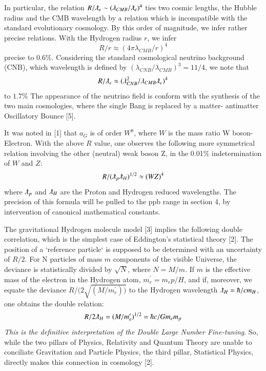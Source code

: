 \documentclass[twoside,draft]{article}
\begin{document}
\begin{sloppypar}
{In particular, the relation $R/\lambdabar_{e} \sim (\lambda_{CMB} / \lambdabar_{e})^{4}$ ties two cosmic lengths, the Hubble radius and the CMB wavelength by a relation which is incompatible with the standard evolutionary cosmology. By this order of magnitude, we infer rather precise relations. With the Hydrogen radius $r$, we infer $$R/r \approx (4\pi \lambda_{CMB} /r)^{4}$$ precise to $0.6\%$. 
Considering the standard cosmological neutrino background (CNB), which wavelength is defined by $(\lambda_{CNB} / \lambda_{CMB})^{3} = 11/4$, we note that $$R/ \lambdabar_{e} \approx
( \lambda_{CNB}^{2} / \lambda_{CMB} \lambdabar_{e} )^{4}$$ to $1.7\%$
The appearance of the neutrino field is conform
with the synthesis of the two main cosmologies, where the single Bang is replaced by a matter-
antimatter Oscillatory Bounce [5].

It was noted in [1] that $a_{G}$ is of order $W^{8}$, where $W$ is the mass ratio W boson-
Electron. With the above $R$ value, one observes the following more symmetrical relation involving
the other (neutral) weak boson Z, in the 0.01\% indetermination of $W$ and $Z$:
\begin{equation}
R/(\lambdabar_{p}\lambdabar_{H})^{1/2}\approx (WZ)^4
\end{equation}
where $\lambdabar_{p}$ and $\lambdabar_{H}$ are the Proton and Hydrogen reduced wavelengths. The precision of this formula will be pulled to the ppb range in section 4, by intervention of canonical mathematical constants.

The gravitational Hydrogen molecule model [3] implies the following double correlation,
which is the simplest case of Eddington's statistical theory [2]. The position of a `reference particle`
is supposed to be determined with an uncertainty of ${R/2}$. For N particles of mass $m$ components of the visible Universe, the deviance is statistically divided by $\sqrt{N}$, where $N = M/m$. If $m$ is the effective mass of the electron in the Hydrogen atom, $m^{\prime}_{e} = m_{e} p/H$, and if, moreover, we equate
the deviance $R/(2\sqrt{(M/m^{\prime}_{e}))}$ to the Hydrogen wavelength $\lambdabar_{H} = \hbar/c m_{H}$, one obtains the double relation:
\begin{equation}
R/2\lambdabar_{H} = (M/m^{\prime}_{e})^{1/2} = \hbar c/G m_{e} m_{p}
\end{equation}
\textit{This is the definitive interpretation of the Double Large Number Fine-tuning}. So, while the two
pillars of Physics, Relativity and Quantum Theory are unable to conciliate Gravitation and Particle
Physics, the third pillar, Statistical Physics, directly makes this connection in cosmology [2].

}
\end{sloppypar}
\end{document}
